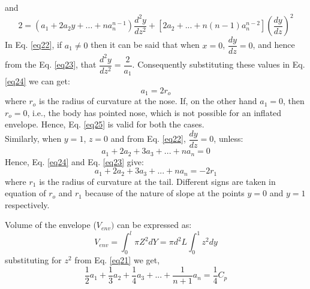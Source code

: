 and
\begin{equation}
\label{eq23}
2 = \left(a_1 + 2a_2y +...+ na_n^{n-1}\right)\dfrac{d^2y}{dz^2} + \left[2a_2 + ...+n(n-1)a_n^{n-2}\right]\left(\dfrac{dy}{dz}\right)^2
\end{equation}
In Eq. \ref{eq22}, if $a_1\ne 0$ then it can be said that when $x = 0$, $\dfrac{dy}{dz} = 0$, and hence from the Eq. \ref{eq23}, that
$\dfrac{d^2y}{dz^2} = \dfrac{2}{a_1}$. Consequently substituting these values in Eq. \ref{eq24} we can get:
\begin{equation}
\label{eq25}
a_1 = 2r_o
\end{equation}
where $r_o$ is the radius of curvature at the nose. If, on the other hand $a_1 = 0$, then $r_o = 0$, i.e., the body has pointed nose, which is not possible for an inflated envelope. Hence, Eq. \ref{eq25} is valid for both the cases.\\
Similarly, when $y = 1$, $z = 0$ and from Eq. \ref{eq22},     $\dfrac{dy}{dz} = 0$, unless:
\begin{equation}
\label{eq26}
a_1 + 2a_2 + 3a_3 +...+na_n = 0
\end{equation}
Hence, Eq. \ref{eq24} and Eq. \ref{eq23} give:
\begin{equation}
\label{eq27}
a_1 + 2a_2 + 3a_3 +...+na_n = -2r_1
\end{equation}
where $r_1$ is the radius of curvature at the tail. Different signs are taken in equation of $r_o$ and $r_1$ because of the nature of slope at the points $y = 0$ and $y = 1$ respectively.

Volume of the envelope ($ V_{env}) $ can be expressed as:
\begin{equation}
V_{env} = \int_{0}^{l}\pi Z^2 dY = \pi d^2L\int_{0}^{1}z^2dy	
\end{equation}
substituting for $z^2$ from Eq. \ref{eq21} we get,
\begin{equation}
\dfrac{1}{2}a_1	+ \dfrac{1}{3}a_2 + \dfrac{1}{4}a_3+ ... + \dfrac{1}{n+1}a_n = \dfrac{1}{4}C_p
\end{equation}

